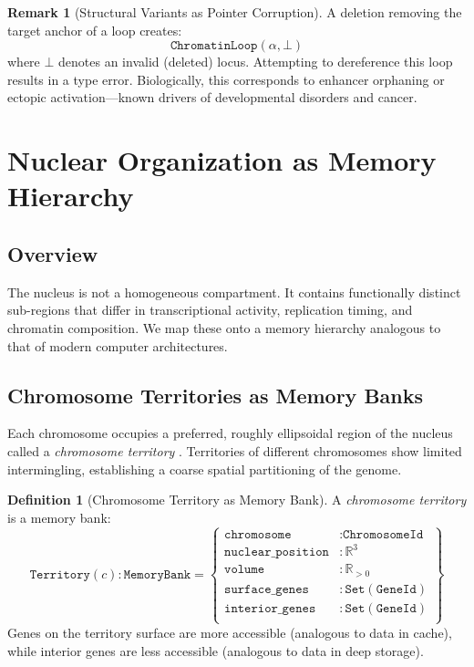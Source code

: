 \documentclass[12pt,a4paper]{article}
\theoremstyle{plain}
\theoremstyle{definition}
\newtheorem{definition}[theorem]{Definition}
\newtheorem{remark}[theorem]{Remark}
\begin{document}
\begin{remark}[Structural Variants as Pointer Corruption]
A deletion removing the target anchor of a loop creates:
\[
  \texttt{ChromatinLoop}(\alpha, \bot)
\]
where $\bot$ denotes an invalid (deleted) locus. Attempting to dereference this loop results in a type error. Biologically, this corresponds to enhancer orphaning or ectopic activation---known drivers of developmental disorders and cancer.
\end{remark}


\section{Nuclear Organization as Memory Hierarchy}\label{sec:nuclear}

\subsection{Overview}

The nucleus is not a homogeneous compartment. It contains functionally distinct sub-regions that differ in transcriptional activity, replication timing, and chromatin composition. We map these onto a memory hierarchy analogous to that of modern computer architectures.

\subsection{Chromosome Territories as Memory Banks}

Each chromosome occupies a preferred, roughly ellipsoidal region of the nucleus called a \emph{chromosome territory} \cite{cremer2001chromosome}. Territories of different chromosomes show limited intermingling, establishing a coarse spatial partitioning of the genome.

\begin{definition}[Chromosome Territory as Memory Bank]\label{def:territory}
A \emph{chromosome territory} is a memory bank:
\[
  \texttt{Territory}(c) : \texttt{MemoryBank} = \left\{
    \begin{array}{ll}
      \texttt{chromosome} &: \texttt{ChromosomeId} \\
      \texttt{nuclear\_position} &: \mathbb{R}^3 \\
      \texttt{volume} &: \mathbb{R}_{>0} \\
      \texttt{surface\_genes} &: \texttt{Set}(\texttt{GeneId}) \\
      \texttt{interior\_genes} &: \texttt{Set}(\texttt{GeneId}) \\
    \end{array}
  \right\}
\]
Genes on the territory surface are more accessible (analogous to data in cache), while interior genes are less accessible (analogous to data in deep storage).
\end{definition}
\end{document}
